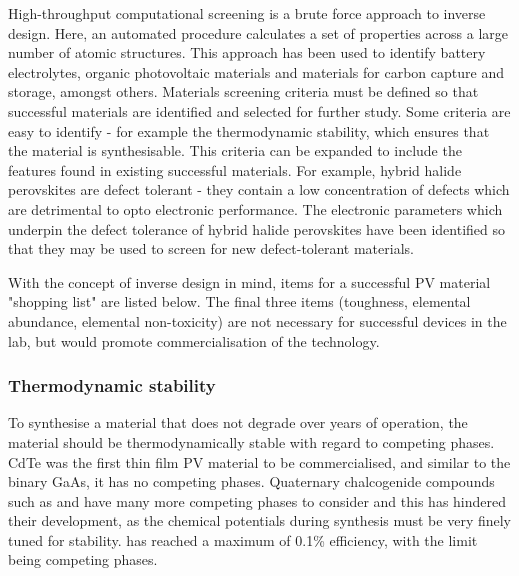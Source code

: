 High-throughput computational screening is a brute force approach to inverse design. Here, an automated procedure calculates a set of properties across a large number of atomic structures. This approach has been used to identify battery electrolytes, organic photovoltaic materials and materials for carbon capture and storage, amongst others. Materials screening criteria must be defined so that successful materials are identified and selected for further study. Some criteria are easy to identify - for example the thermodynamic stability, which ensures that the material is synthesisable. This criteria can be expanded to include the features found in existing successful materials. For example, hybrid halide perovskites are defect tolerant - they contain a low concentration of defects which are detrimental to opto electronic performance. The electronic parameters which underpin the defect tolerance of hybrid halide perovskites have been identified so that they may be used to screen for new defect-tolerant materials.\autocite{Brandt2015} 

With the concept of inverse design in mind, items for a successful PV material "shopping list" are listed below. The final three items (toughness, elemental abundance, elemental non-toxicity) are not necessary for successful devices in the lab, but would promote commercialisation of the technology.

\subsubsection{Thermodynamic stability}
To synthesise a material that does not degrade over years of operation, the material should be thermodynamically stable with regard to competing phases. CdTe was the first thin film PV material to be commercialised, and similar to the binary GaAs, it has no competing phases. Quaternary chalcogenide compounds such as  and  have many more competing phases to consider and this has hindered their development, as the chemical potentials during synthesis must be very finely tuned for stability.  has reached a maximum of 0.1\% efficiency, with the limit being competing phases.



